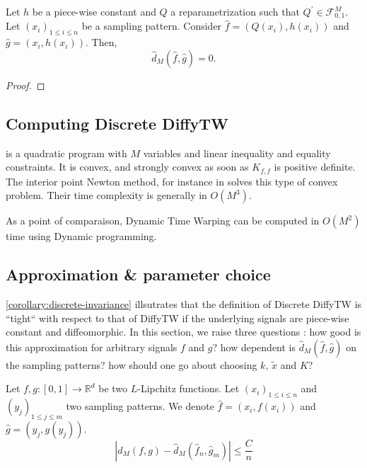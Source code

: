 \begin{corollary}\label{corollary:discrete-invariance}
Let $h$ be a piece-wise constant and $Q$ a reparametrization such that $Q^\prime \in \mathcal F_{0,1}^M$. Let $(x_i)_{1 \leq i \leq n}$ be a sampling pattern. Consider $\hat f = (Q(x_i), h(x_i))$ and $\hat g = (x_i, h(x_i))$. Then,
\begin{equation}
\hat d_M(\hat f, \hat g) = 0.
\end{equation}
\end{corollary}
\begin{proof}
\end{proof}

\subsection{Computing Discrete DiffyTW}\label{sec:solving-qp}

 is a quadratic program with $M$ variables and linear inequality and equality constraints. It is convex, and strongly convex as soon as $K_{f,f}$ is positive definite. The interior point Newton method, for instance in \cite{fabian} solves this type of convex problem. Their time complexity is generally in $O(M^3)$.

As a point of comparaison, Dynamic Time Warping can be computed in $O(M^2)$ time using Dynamic programming.

\subsection{Approximation \& parameter choice}
\cref{corollary:discrete-invariance} illsutrates that the definition of Discrete DiffyTW is ``tight`` with respect to that of DiffyTW if the underlying signals are piece-wise constant and diffeomorphic. In this section, we raise three questions : how good is this approximation for arbitrary signals $f$ and $g$? how dependent is $\hat d_M(\hat f, \hat g)$ on the sampling patterns? how should one go about choosing $k$, $\tilde x$ and $K$?
\begin{theorem}\label{thm:rectangle-approx}
Let $f,g:[0,1] \to \mathbb R^d$ be two $L$-Lipchitz functions. Let $(x_i)_{1\leq i \leq n}$ and $(y_j)_{1\leq j\leq m}$ two sampling patterns. We denote $\hat f = (x_i, f(x_i))$ and $\hat g = (y_j, g(y_j))$.
\begin{equation}
    \left\vert d_M(f, g) - \hat d_M(\hat f_n, \hat g_m)\right\vert \leq \frac{C}{n}
\end{equation}
\end{theorem}


